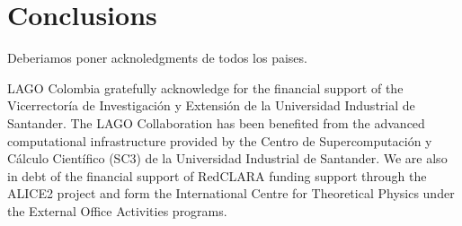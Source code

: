 \section{Conclusions}\label{sec:conclusions}

\acknowledgments
Deberiamos poner acknoledgments de todos los paises.


LAGO Colombia gratefully acknowledge for the financial support of the
Vicerrector\'ia de Investigaci\'on y Extensi\'on de la Universidad Industrial
de Santander. The LAGO Collaboration has been benefited from the advanced
computational infrastructure provided by the Centro de Supercomputaci\'on y
C\'alculo Cient\'ifico (SC3) de la Universidad Industrial de Santander. We are
also in debt of the financial support of RedCLARA funding support through the
ALICE2 project and form the International Centre for Theoretical Physics under
the External Office Activities programs.

